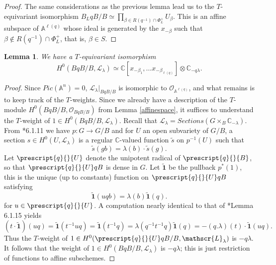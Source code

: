 \documentclass[12pt,reqno]{amsart}
\newtheorem{lemma}[theorem]{Lemma}
\theoremstyle{definition}
\begin{document}
\begin{proof}
The same considerations as the previous lemma lead us to the $T$-equivariant isomorphism $B_LqB/B \simeq \prod_{\beta \in R(q^{-1}) \cap \Phi_L^+} U_{\beta}$. This is an affine subspace of $\mathbb{A}^{\ell(q)}$ whose ideal is generated by the $x_{-\beta}$ such that $\beta \notin R(q^{-1} )\cap \Phi_L^+$, that is, $\beta \in S$.
\end{proof}

\begin{lemma} \label{cellweights}
We have a $T$-equivariant isomorphism \[H^0(BqB/B, \mathscr{L}_{\lambda}) \simeq \mathbb{C}[x_{-\beta_1}, \dots x_{-\beta_{\ell(q)}}] \otimes \mathbb{C}_{-q \lambda}.\]
\end{lemma}

\begin{proof}
Since $Pic(\mathbb{A}^n)=0$, $\mathscr{L}_{\lambda}|_{BqB/B}$ is isomorphic to $\mathscr{O}_{\mathbb{A}^{\ell(q)}}$, and what remains is to keep track of the $T$-weights. Since we already have a description of the $T$-module $H^0(BqB/B, \mathscr{O}_{BqB/B})$ from Lemma \ref{affinespace}, it suffices to understand the $T$-weight of $1 \in H^0(BqB/B, \mathscr{L}_{\lambda})$. Recall that $\mathscr{L}_{\lambda}= Sections(G \times_B \mathbb{C}_{-\lambda})$. From \cite{ChrissGinzburg}*{6.1.11}  we have $p:G \rightarrow G/B$ and for $U$ an open subvariety of $G/B$, a section $s \in H^0(U, \mathscr{L}_{\lambda})$ is a regular $\mathbb{C}$-valued function $\tilde{s}$ on $p^{-1}(U)$ such that \[\tilde{s}(gb)=\lambda(b) \cdot \tilde{s}(g).\] Let $\prescript{q}{}{U}$ denote the unipotent radical of $\prescript{q}{}{B}$, so that $\prescript{q}{}{U}qB$ is dense in $G$. Let $\tilde{\mathbf{1}}$ be the pullback $p^*(1)$, this is the unique (up to constants) function on $\prescript{q}{}{U}qB$ satisfying \[\tilde{\mathbf{1}}(uqb)=\lambda(b) \tilde{\mathbf{1}}(q).\] for $u \in \prescript{q}{}{U}$. A computation nearly identical to that of \cite{ChrissGinzburg}*{Lemma 6.1.15} yields 
 \[(t \cdot \tilde{\mathbf{1}})(uq)=\tilde{\mathbf{1}}(t^{-1}uq)=\tilde{\mathbf{1}}(t^{-1}q)=\lambda(q^{-1}t^{-1}q) \tilde{\mathbf{1}}(q)=-(q. \lambda)(t) \cdot \tilde{\mathbf{1}}(uq).\] 
 Thus the $T$-weight of $1 \in H^0(\prescript{q}{}{U}qB/B, \mathscr{L}_{\lambda})$ is $-q \lambda$. It follows that the weight of $1 \in H^0(BqB/B, \mathscr{L}_{\lambda})$ is $-q\lambda$; this is just restriction of functions to affine subschemes.
\end{proof}
\end{document}
